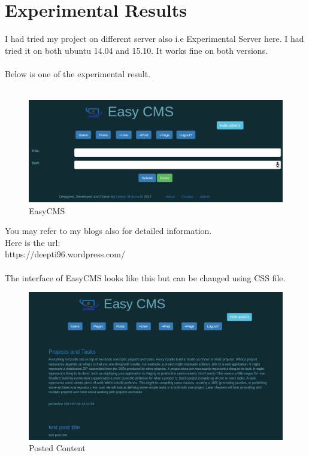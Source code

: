 
\section{Experimental Results}
I had tried my project on different server also i.e Experimental Server here. I had tried it on both ubuntu 14.04 and 15.10. It works fine on both versions.\\\\
Below is one of the experimental result.\\\\
\begin{figure}[!ht]
	\centering
	\includegraphics[scale=0.45]{input/images/add.png}                
	\caption{EasyCMS}
	\hspace{-1.5em}
\end{figure}
You may refer to my blogs also for detailed information.\\
Here is the url: \\
https://deepti96.wordpress.com/ \\\\
The interface of EasyCMS looks like this but can be changed using CSS file.
\begin{figure}[!ht]
	\centering
	\includegraphics[scale=0.45]{input/images/web.png}                
	\caption{Posted Content}
	\hspace{-1.5em}
\end{figure}\\\\
